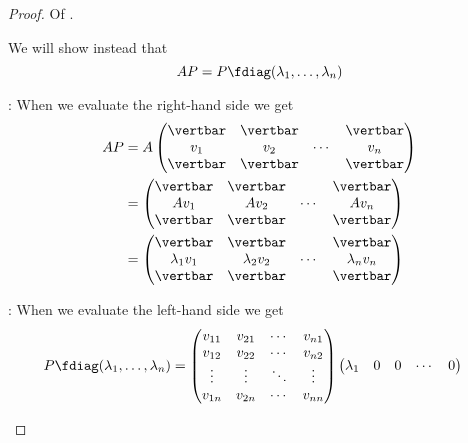 \begin{proof}
	Of .
	\begin{flushleft}
		We will show instead that
		\begin{equation*}
			AP=P\fdiag(\lambda_1,\dots,\lambda_n)
		\end{equation*}
	\end{flushleft}
	\begin{flushleft}
		\proofright: When we evaluate the right-hand side we get
		\begin{align*}
			AP & =A\begin{pmatrix}
				\vertbar & \vertbar &        & \vertbar \\
				v_1      & v_2      & \cdots & v_n      \\
				\vertbar & \vertbar &        & \vertbar
			\end{pmatrix} \\
			   & =\begin{pmatrix}
				\vertbar & \vertbar &        & \vertbar \\
				Av_1     & Av_2     & \cdots & Av_n     \\
				\vertbar & \vertbar &        & \vertbar
			\end{pmatrix}  \\
			   & =\begin{pmatrix}
				\vertbar      & \vertbar      &        & \vertbar      \\
				\lambda_1 v_1 & \lambda_2 v_2 & \cdots & \lambda_n v_n \\
				\vertbar      & \vertbar      &        & \vertbar
			\end{pmatrix}
		\end{align*}
	\end{flushleft}
	\begin{flushleft}
		\proofleft: When we evaluate the left-hand side we get
		\begin{align*}
			P\fdiag(\lambda_1,\dots,\lambda_n) & =
			\begin{pmatrix}
				v_{11} & v_{21} & \cdots & v_{n1} \\
				v_{12} & v_{22} & \cdots & v_{n2} \\
				\vdots & \vdots & \ddots & \vdots \\
				v_{1n} & v_{2n} & \cdots & v_{nn}
			\end{pmatrix}
			\begin{pmatrix}
				\lambda_1 & 0         & 0         & \cdots & 0         \\

\end{pmatrix}
\end{align*}
\end{flushleft}
\end{proof}
